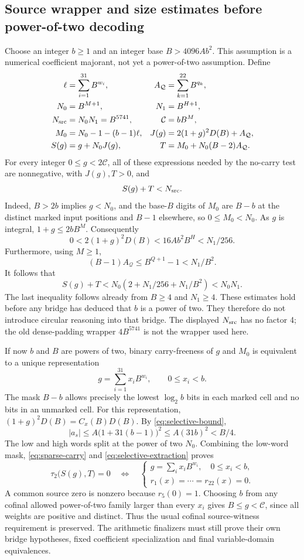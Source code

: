 \subsection{Source wrapper and size estimates before power-of-two decoding}
Choose an integer $b\geq1$ and an integer base
$B>4096Ab^2$.  This assumption is a numerical coefficient majorant,
not yet a power-of-two assumption.  Define
\[
\begin{aligned}
 \ell&=\sum_{i=1}^{31}B^{w_i},& A_{\mathcal Q}&=\sum_{k=1}^{22}B^{q_k},\\
 N_0&=B^{M+1},&N_1&=B^{H+1},\\
 N_{\rm src}&=N_0N_1=B^{5741},&\mathcal C&=bB^M,\\
 M_0&=N_0-1-(b-1)\ell,&J(g)&=2(1+g)^2D(B)+A_{\mathcal Q},\\
 S(g)&=g+N_0J(g),& T&=M_0+N_0(B-2)A_{\mathcal Q}.
\end{aligned}
\]
For every integer $0\leq g<2\mathcal C$, all of these expressions
needed by the no-carry test are nonnegative, with $J(g),T>0$, and
\begin{equation}
 S(g)+T<N_{\rm src}.\label{eq:source-pair-bound}
\end{equation}
Indeed, $B>2b$ implies $g<N_0$, and the base-$B$ digits of $M_0$ are
$B-b$ at the distinct marked input positions and $B-1$ elsewhere, so
$0\leq M_0<N_0$.  As $g$ is integral, $1+g\leq2bB^M$.  Consequently
\[
 0<2(1+g)^2D(B)<16Ab^2B^H<N_1/256.
\]
Furthermore, using $M\geq1$,
\[
 (B-1)A_{\mathcal Q}\leq B^{Q+1}-1<N_1/B^2.
\]
It follows that
\[
 S(g)+T<N_0\left(2+N_1/256+N_1/B^2\right)<N_0N_1.
\]
The last inequality follows already from $B\geq4$ and $N_1\geq4$.
These estimates hold before any bridge has deduced that $b$ is a power
of two.  They therefore do not introduce circular reasoning into that
bridge.  The displayed $N_{\rm src}$ has no factor 4; the old dense-padding
wrapper $4B^{5741}$ is not the wrapper used here.

If now $b$ and $B$ are powers of two, binary carry-freeness of $g$ and
$M_0$ is equivalent to a unique representation
\[
 g=\sum_{i=1}^{31}x_iB^{w_i},\qquad 0\leq x_i<b.
\]
The mask $B-b$ allows precisely the lowest $\log_2 b$ bits in each
marked cell and no bits in an unmarked cell.  For this representation,
$(1+g)^2D(B)=C_x(B)D(B)$.  By \eqref{eq:selective-bound},
\[
 |a_s|\leq A\bigl(1+31(b-1)\bigr)^2
 \leq A(31b)^2<B/4.
\]
The low and high words split at the power of two $N_0$.  Combining the
low-word mask, \eqref{eq:sparse-carry} and
\eqref{eq:selective-extraction} proves
\[
 \tau_2\bigl(S(g),T\bigr)=0
 \quad\Longleftrightarrow\quad
 \begin{cases}
 g=\sum_i x_iB^{w_i},\quad 0\leq x_i<b,\\
 r_1(x)=\cdots=r_{22}(x)=0.
 \end{cases}
\]
A common source zero is nonzero because $r_5(0)=1$.  Choosing $b$ from
any cofinal allowed power-of-two family larger than every $x_i$ gives
$B\leq g<\mathcal C$, since all weights are positive and distinct.
Thus the usual cofinal source-witness requirement is preserved.
The arithmetic finalizers must still prove their own bridge hypotheses,
fixed coefficient specialization and final variable-domain equivalences.

